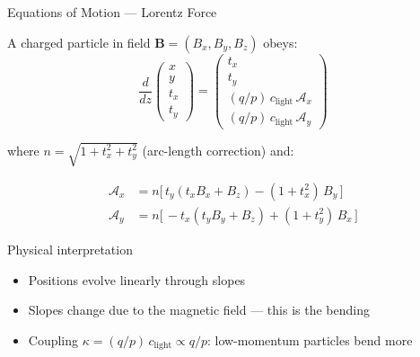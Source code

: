 \documentclass[aspectratio=169, 11pt]{beamer}
\newcommand{\qop}{q/p}
\newcommand{\bvec}[1]{\mathbf{#1}}
\newcommand{\clgt}{c_\text{light}}
\newcommand{\tx}{t_x}
\newcommand{\ty}{t_y}
\begin{document}
\begin{frame}{Equations of Motion --- Lorentz Force}

A charged particle in field $\bvec{B} = (B_x, B_y, B_z)$ obeys:
\begin{equation*}
  \frac{d}{dz}
  \begin{pmatrix} x \\ y \\ \tx \\ \ty \end{pmatrix}
  =
  \begin{pmatrix} \tx \\ \ty \\
    (\qop)\,\clgt\, \mathcal{A}_x \\
    (\qop)\,\clgt\, \mathcal{A}_y
  \end{pmatrix}
\end{equation*}

where $n = \sqrt{1 + \tx^2 + \ty^2}$ (arc-length correction) and:

\begin{align*}
  \mathcal{A}_x &= n\bigl[\,\ty(\tx B_x + B_z) - (1+\tx^2)\,B_y\,\bigr]
  \\[4pt]
  \mathcal{A}_y &= n\bigl[\,-\tx(\ty B_y + B_z) + (1+\ty^2)\,B_x\,\bigr]
\end{align*}

\vspace{4pt}
\begin{block}{Physical interpretation}
  \begin{itemize}
    \item Positions evolve linearly through slopes
    \item Slopes change due to the magnetic field --- this is the bending
    \item Coupling $\kappa = (\qop)\,\clgt \propto q/p$: low-momentum
          particles bend more
  \end{itemize}
\end{block}
\end{frame}
\end{document}
